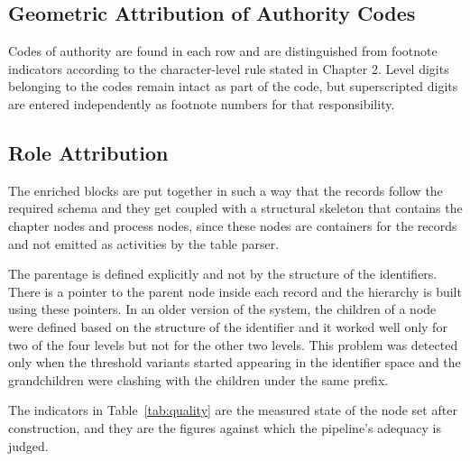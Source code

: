 \subsection{Geometric Attribution of Authority Codes}

Codes of authority are found in each row and are distinguished from footnote indicators according to the character-level rule stated in Chapter 2. Level digits belonging to the codes remain intact as part of the code, but superscripted digits are entered independently as footnote numbers for that responsibility.

\subsection{Role Attribution}

The enriched blocks are put together in such a way that the records follow the required schema and they get coupled with a structural skeleton that contains the chapter nodes and process nodes, since these nodes are containers for the records and not emitted as activities by the table parser.

The parentage is defined explicitly and not by the structure of the identifiers. There is a pointer to the parent node inside each record and the hierarchy is built using these pointers. In an older version of the system, the children of a node were defined based on the structure of the identifier and it worked well only for two of the four levels but not for the other two levels. This problem was detected only when the threshold variants started appearing in the identifier space and the grandchildren were clashing with the children under the same prefix.

The indicators in Table~\ref{tab:quality} are the measured state of the node set after construction, and they are the figures against which the pipeline's adequacy is judged.


